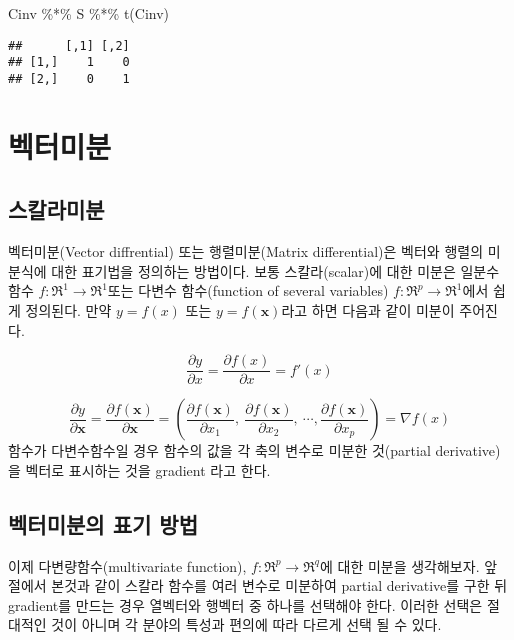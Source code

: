 \documentclass[
]{book}
\newenvironment{Shaded}{\begin{snugshade}}{\end{snugshade}}
\newcommand{\FunctionTok}[1]{\textcolor[rgb]{0.00,0.00,0.00}{#1}}
\newcommand{\NormalTok}[1]{#1}
\newcommand{\SpecialCharTok}[1]{\textcolor[rgb]{0.00,0.00,0.00}{#1}}
\newcommand{\pardiff}[2]{\frac{\partial #1}{\partial #2 }}
\theoremstyle{definition}
\theoremstyle{definition}
\theoremstyle{definition}
\theoremstyle{remark}
\begin{document}
\begin{Shaded}
\begin{Highlighting}[]
\NormalTok{Cinv }\SpecialCharTok{\%*\%}\NormalTok{ S }\SpecialCharTok{\%*\%} \FunctionTok{t}\NormalTok{(Cinv)}
\end{Highlighting}
\end{Shaded}

\begin{verbatim}
##      [,1] [,2]
## [1,]    1    0
## [2,]    0    1
\end{verbatim}

\hypertarget{vectordiff}{%
\chapter{벡터미분}\label{vectordiff}}

\hypertarget{uxc2a4uxce7cuxb77cuxbbf8uxbd84}{%
\section{스칼라미분}\label{uxc2a4uxce7cuxb77cuxbbf8uxbd84}}

벡터미분(Vector diffrential) 또는 행렬미분(Matrix differential)은 벡터와 행렬의 미분식에 대한 표기법을
정의하는 방법이다. 보통 스칼라(scalar)에 대한 미분은 일분수 함수 \(f: \Re^1 \rightarrow \Re^1\)또는 다변수 함수(function of several variables) \(f: \Re^p \rightarrow \Re^1\)에서 쉽게 정의된다. 만약 \(y = f(x)\) 또는 \(y=f(\bm x)\)라고 하면 다음과 같이 미분이 주어진다.

\[ \pardiff{y}{x}= \pardiff{f(x)}{x} = f'(x)  \]

\[ \pardiff{y}{\bm x} =\pardiff{f(\bm x)}{\bm x} =  \left (\pardiff{f(\bm x)}{x_1},~\pardiff{f(\bm x)}{x_2},~\cdots, \pardiff{f(\bm x)}{x_p} \right )  = \nabla  f(x)\]
함수가 다변수함수일 경우 함수의 값을 각 축의 변수로 미분한 것(partial derivative)을 벡터로 표시하는 것을 gradient 라고 한다.

\hypertarget{uxbca1uxd130uxbbf8uxbd84uxc758-uxd45cuxae30-uxbc29uxbc95}{%
\section{벡터미분의 표기 방법}\label{uxbca1uxd130uxbbf8uxbd84uxc758-uxd45cuxae30-uxbc29uxbc95}}

이제 다변량함수(multivariate function), \(f: \Re^p \rightarrow \Re^q\)에 대한 미분을 생각해보자. 앞 절에서
본것과 같이 스칼라 함수를 여러 변수로 미분하여 partial derivative를 구한 뒤 gradient를 만드는 경우 열벡터와 행벡터 중 하나를 선택해야 한다. 이러한 선택은 절대적인 것이 아니며 각 분야의 특성과 편의에 따라 다르게 선택 될 수 있다.
\end{document}
